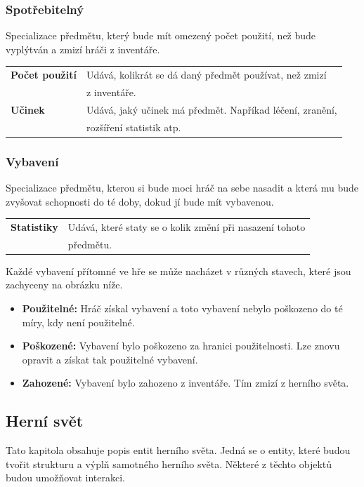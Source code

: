\documentclass[12pt,a4paper]{article}
\begin{document}
\subsubsection{Spotřebitelný}
Specializace předmětu, který bude mít omezený počet použití, než bude vyplýtván
a zmizí hráči z inventáře. \\[5pt]

\begin{tabular*}{0.87\textwidth}{ll}
  \bf Počet použití & Udává, kolikrát se dá daný předmět používat, než zmizí\\
                    & z inventáře.\\[7pt]
  \bf Učinek & Udává, jaký učinek má předmět. Napříkad léčení, zranění,\\
             & rozšíření statistik atp. \\[7pt]
\end{tabular*}

\subsubsection{Vybavení}
Specializace předmětu, kterou si bude moci hráč na sebe nasadit a která mu bude
zvyšovat schopnosti do té doby, dokud jí bude mít vybavenou.\\[5pt]

\begin{tabular*}{0.78\textwidth}{ll}
  \bf Statistiky & Udává, které staty se o kolik změní při nasazení tohoto\\
  & předmětu.\\[7pt]
\end{tabular*}

Každé vybavení přítomné ve hře se může nacházet v různých stavech, které jsou
zachyceny na obrázku níže.

\begin {itemize}
\item{\textbf{Použitelné:} Hráč získal vybavení a toto vybavení nebylo poškozeno
  do té míry, kdy není použitelné.}
\item{\textbf{Poškozené:} Vybavení bylo poškozeno za hranici použitelnosti. Lze
  znovu opravit a získat tak použitelné vybavení.}
\item{\textbf{Zahozené:} Vybavení bylo zahozeno z inventáře. Tím zmizí z herního
  světa.}
\end {itemize}

\subsection{Herní svět}
Tato kapitola obsahuje popis entit herního světa. Jedná se o entity, které budou
tvořit strukturu a výplň samotného herního světa. Některé z těchto objektů budou
umožňovat interakci.
 
\end{document}
